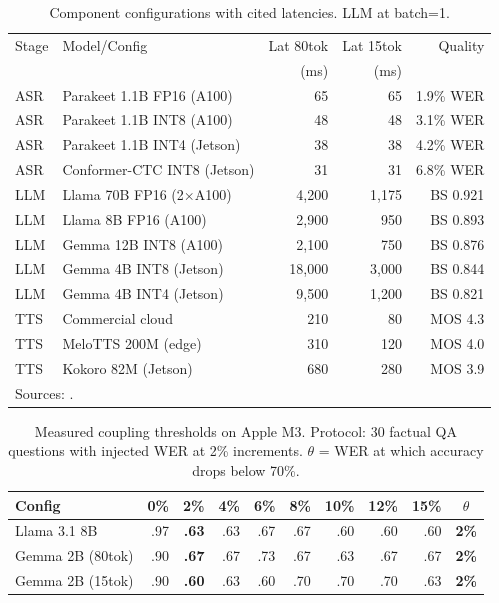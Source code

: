 \documentclass{article}
\begin{document}
\begin{table}[t]
\centering
\caption{Component configurations with cited latencies. LLM at batch=1.}
\label{tab:models}
\small
\begin{tabular}{llrrr}
\toprule
Stage & Model/Config & Lat 80tok & Lat 15tok & Quality \\
 & & (ms) & (ms) & \\
\midrule
ASR & Parakeet 1.1B FP16 (A100)   & 65  & 65  & 1.9\% WER \\
ASR & Parakeet 1.1B INT8 (A100)   & 48  & 48  & 3.1\% WER \\
ASR & Parakeet 1.1B INT4 (Jetson) & 38  & 38  & 4.2\% WER \\
ASR & Conformer-CTC INT8 (Jetson) & 31  & 31  & 6.8\% WER \\
\midrule
LLM & Llama 70B FP16 (2$\times$A100) & 4{,}200 & 1{,}175 & BS 0.921 \\
LLM & Llama 8B FP16 (A100)        & 2{,}900 &   950 & BS 0.893 \\
LLM & Gemma 12B INT8 (A100)       & 2{,}100 &   750 & BS 0.876 \\
LLM & Gemma 4B INT8 (Jetson)      & 18{,}000 & 3{,}000 & BS 0.844 \\
LLM & Gemma 4B INT4 (Jetson)      &  9{,}500 & 1{,}200 & BS 0.821 \\
\midrule
TTS & Commercial cloud            & 210 & 80  & MOS 4.3 \\
TTS & MeloTTS 200M (edge)         & 310 & 120 & MOS 4.0 \\
TTS & Kokoro 82M (Jetson)         & 680 & 280 & MOS 3.9 \\
\bottomrule
\multicolumn{5}{l}{\scriptsize Sources: \citep{parakeet2025,mlperf2025,song2023powerinfer,dettmers2022llmint8}.}
\end{tabular}
\end{table}

\begin{table}[t]
\centering
\caption{Measured coupling thresholds on Apple M3. Protocol: 30 factual QA questions with injected WER at 2\% increments. $\theta$ = WER at which accuracy drops below 70\%.}
\label{tab:coupling_measured}
\small
\begin{tabular}{lrrrrrrrrc}
\toprule
Config & 0\% & 2\% & 4\% & 6\% & 8\% & 10\% & 12\% & 15\% & $\theta$ \\
\midrule
Llama 3.1 8B    & .97 & \textbf{.63} & .63 & .67 & .67 & .60 & .60 & .60 & \textbf{2\%} \\
Gemma 2B (80tok) & .90 & \textbf{.67} & .67 & .73 & .67 & .63 & .67 & .67 & \textbf{2\%} \\
Gemma 2B (15tok) & .90 & \textbf{.60} & .63 & .60 & .70 & .70 & .70 & .63 & \textbf{2\%} \\
\bottomrule
\end{tabular}
\end{table}
\end{document}
